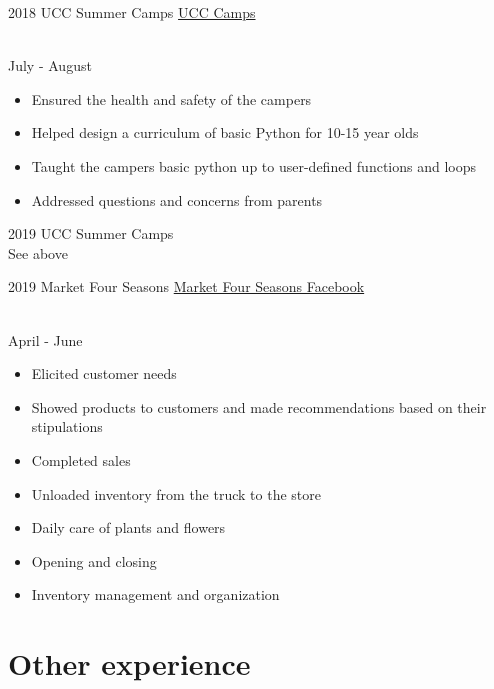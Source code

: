 \documentclass[]{cv-style}          %
\begin{document}
\begin{entrylist}
\entry
    {2018}
    {UCC Summer Camps}
    {\href{https://www.ucc.on.ca/summer/summer-camps}{UCC Camps}}
    {\\
    July - August
    \begin{itemize}
     \item Ensured the health and safety of the campers
     \item Helped design a curriculum of basic Python for 10-15 year olds
     \item Taught the campers basic python up to user-defined functions and loops
     \item Addressed questions and concerns from parents
    \end{itemize}}

\entry
    {2019}
    {UCC Summer Camps}
    {}
    {\\
    See above}

\entry
  {2019}
  {Market Four Seasons}
  {\href{https://www.facebook.com/pages/Market-Four-Seasons-Inc/657595777714692}
            {Market Four Seasons Facebook}}
  {\\
  April - June
  \begin{itemize}
    \item Elicited customer needs
     \item Showed products to customers and made recommendations based on their stipulations
     \item Completed sales
     \item Unloaded inventory from the truck to the store
     \item Daily care of plants and flowers
     \item Opening and closing
     \item Inventory management and organization
  \end{itemize}}

\end{entrylist}





\section{Other experience}
\end{document}
